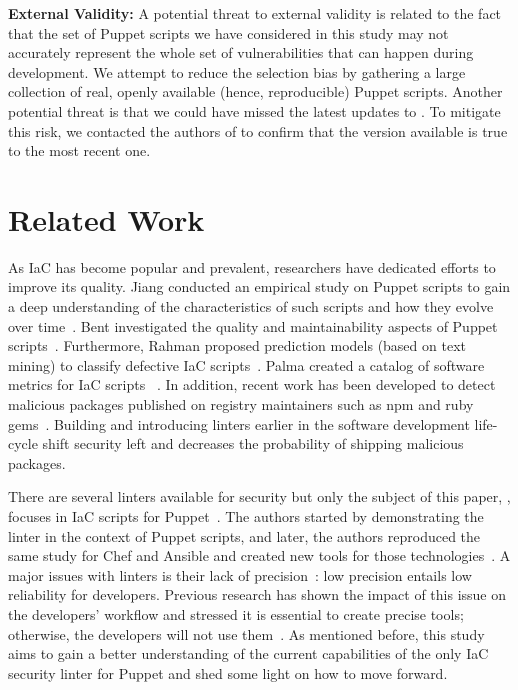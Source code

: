 \textbf{External Validity:} A potential threat to external validity 
is related to the fact that the set of Puppet scripts we have considered 
in this study may not accurately represent the whole set of 
vulnerabilities that can happen during development. We attempt to reduce
the selection bias by gathering a large collection of real, openly 
available (hence, reproducible) Puppet scripts. Another potential threat 
is that we could have missed the latest updates to \slic{}. To
mitigate this risk, we contacted the authors of \slic{} to confirm that 
the version available is true to the most recent one. 
%
\section{Related Work}\label{sec:rw}
%
As IaC has become popular and prevalent, researchers 
have dedicated efforts to improve its quality. Jiang \etal{} conducted
an empirical study on Puppet scripts to gain a deep understanding of the 
characteristics of such scripts and how they evolve over 
time~\cite{7180066}. Bent \etal{} investigated the quality and
maintainability aspects of Puppet scripts~\cite{van2018good}. 
Furthermore, Rahman \etal{} proposed prediction models (based on text
mining) to classify defective IaC scripts~\cite{rahman2018characterizing}. 
Palma \etal{} created a catalog of software metrics for IaC scripts ~\cite{dalla2020towards}. 
In addition, recent work has been developed to detect malicious
packages published on registry maintainers such as npm and ruby
gems~\cite{duan2020measuring}. Building and introducing linters 
earlier in the software development life-cycle shift security 
left and decreases the probability of shipping malicious packages.

There are several linters available for security but only the subject of
this paper, \slic{}, focuses in IaC scripts for Puppet~\cite{8812041}. 
The authors started by demonstrating the linter in the context of Puppet
scripts, and later, the authors reproduced the same study for Chef and 
Ansible and created new tools for those technologies~\cite{10.1145/3408897}. 
A major issues with linters is their lack of precision~\cite{park2016battles,muske2016survey,gauthier2018scalable,landman2017challenges,christakis2016developers,vassallo2020developers}: 
low precision entails low reliability for developers. Previous research 
has shown the impact of this issue on the developers' workflow and stressed 
it is essential to create precise tools; otherwise, the developers 
will not use them~\cite{6606613,7781843,10.1145/1646353.1646374,8622456,8530713,46576}.
As mentioned before, this study aims to gain a better 
understanding of the current capabilities of the only IaC security linter for 
Puppet and shed some light on how to move forward.

